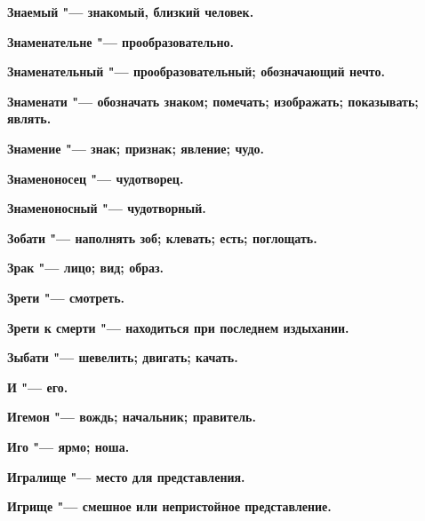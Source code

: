 \bfseries Знаемый \normalfont{} "--- знакомый, близкий человек. 




\bfseries Знаменательне \normalfont{} "--- прообразовательно. 




\bfseries Знаменательный \normalfont{} "--- прообразовательный; обозначающий нечто. 




\bfseries Знаменати \normalfont{} "--- обозначать знаком; помечать; изображать; показывать; являть. 




\bfseries Знамение \normalfont{} "--- знак; признак; явление; чудо. 




\bfseries Знаменоносец \normalfont{} "--- чудотворец. 




\bfseries Знаменоносный \normalfont{} "--- чудотворный. 




\bfseries Зобати \normalfont{} "--- наполнять зоб; клевать; есть; поглощать. 




\bfseries Зрак \normalfont{} "--- лицо; вид; образ. 




\bfseries Зрети \normalfont{} "--- смотреть. 




\bfseries Зрети к смерти \normalfont{} "--- находиться при последнем издыхании. 




\bfseries Зыбати \normalfont{} "--- шевелить; двигать; качать. 




 





\bfseries И \normalfont{} "--- его. 




\bfseries Игемон \normalfont{} "--- вождь; начальник; правитель. 




\bfseries Иго \normalfont{} "--- ярмо; ноша. 




\bfseries Игралище \normalfont{} "--- место для представления. 




\bfseries Игрище \normalfont{} "--- смешное или непристойное представление. 




